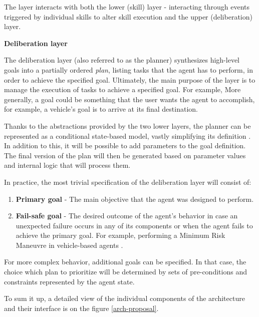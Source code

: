 \documentclass[0main.tex]{subfiles}
\begin{document}
The layer interacts with both the lower (skill) layer - interacting through events triggered by
individual skills to alter skill execution and the upper (deliberation) layer. 
 
\textbf{Deliberation layer}

The deliberation layer (also referred to as the planner) synthesizes high-level goals into a
partially ordered \emph{plan}, listing tasks that the agent has to perform, in order to achieve
the specified goal. Ultimately, the main purpose of the layer is to manage the execution of tasks to
achieve a specified goal. For example,  More generally, a goal could be something that the user
wants the agent to accomplish, for example, a vehicle's goal is to arrive at its final
destination.

Thanks to the abstractions provided by the two lower layers, the planner can be represented as
a conditional state-based model, vastly simplifying its definition \cite{Bonasso1995}. In
addition to this, it will be possible to add parameters to the goal definition. The final version of the plan 
will then be generated based on parameter values and internal logic that will process them.

In practice, the most trivial specification of the deliberation layer will consist of:

\begin{enumerate}[label=\alph*)]
    \item \textbf{Primary goal} - The main objective that the agent was designed to perform.
    \item \textbf{Fail-safe goal} - The desired outcome of the agent's behavior in case an unexpected 
    failure occurs in any of its components or when the agent fails to achieve the primary goal. 
    For example, performing a Minimum Risk Maneuvre in vehicle-based agents
    \cite{WorkingAutonomous2022}. %
 \end{enumerate}

For more complex behavior, additional goals can be specified. In that case, the choice which 
plan to prioritize will be determined by sets of pre-conditions and constraints represented by
the agent state.

To sum it up, a detailed view of the individual components of the architecture and their
interface is on the figure \ref{arch-proposal}.
\end{document}
